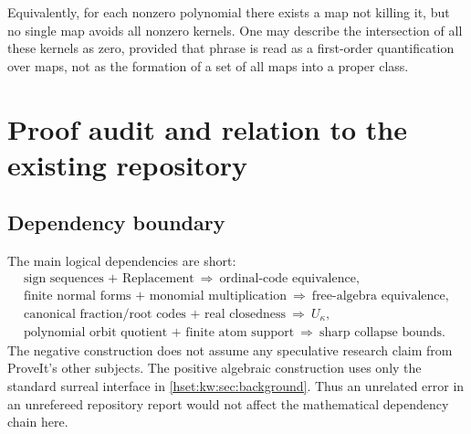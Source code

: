 \documentclass[11pt,letterpaper]{article}
\theoremstyle{definition}
\theoremstyle{remark}
\begin{document}
Equivalently, for each nonzero polynomial there exists a map not killing it, but no single map avoids all nonzero kernels. One may describe the intersection of all these kernels as zero, provided that phrase is read as a first-order quantification over maps, not as the formation of a set of all maps into a proper class.

\section{Proof audit and relation to the existing repository}
\label{hset:kw:sec:audit}

\subsection{Dependency boundary}
The main logical dependencies are short:
\[
\begin{gathered}
\text{sign sequences + Replacement}
\ \Longrightarrow\ \text{ordinal-code equivalence},\\
\text{finite normal forms + monomial multiplication}
\ \Longrightarrow\ \text{free-algebra equivalence},\\
\text{canonical fraction/root codes + real closedness}
\ \Longrightarrow\ U_\kappa,\\
\text{polynomial orbit quotient + finite atom support}
\ \Longrightarrow\ \text{sharp collapse bounds}.
\end{gathered}
\]
The negative construction does not assume any speculative research claim from ProveIt's other subjects. The positive algebraic construction uses only the standard surreal interface in \cref{hset:kw:sec:background}. Thus an unrelated error in an unrefereed repository report would not affect the mathematical dependency chain here.
\end{document}
